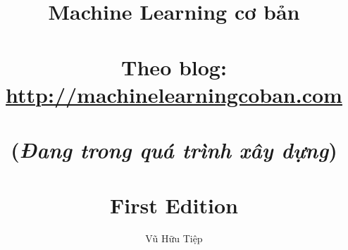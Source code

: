 \documentclass[envcountsame,envcountchap, openany]{mysvmono}
\begin{document}
\author{Vũ Hữu Tiệp}
\title{{\bf Machine Learning cơ bản}\\
\\
\small{\bf Theo blog: \url{http://machinelearningcoban.com}} \\
\\
\small{(\textit{Đang trong quá trình xây dựng})}\\
\\
{\small First Edition}}
\maketitle

\frontmatter%

% 
% 
\tableofcontents



\mainmatter%
% 
% 



















%
%

\backmatter%
% 
% 
\printindex

\end{document}
